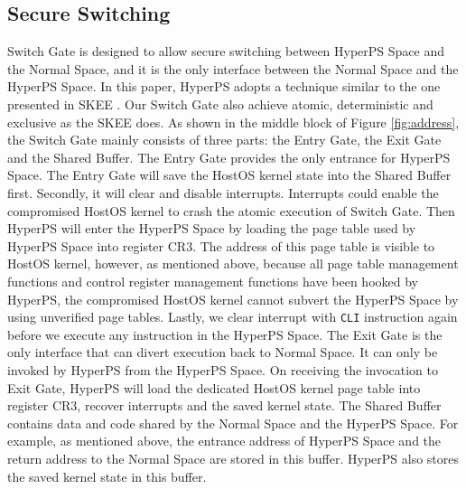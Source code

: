 \subsection{Secure Switching}%
\label{sub:secure_switching}


Switch Gate is designed to allow secure switching between HyperPS Space and the Normal Space, and it is the only interface between the Normal Space and the HyperPS Space. In this paper, HyperPS adopts a technique similar to the one presented in SKEE \cite{azab2016skee}. Our Switch Gate also achieve atomic, deterministic and exclusive as the SKEE does.
As shown in the middle block of Figure \ref{fig:address}, the Switch Gate mainly consists of three parts: the Entry Gate, the Exit Gate and the Shared Buffer. 
The Entry Gate provides the only entrance for HyperPS Space. The Entry Gate will save the HostOS kernel state into the Shared Buffer first. Secondly, it will clear and disable interrupts. Interrupts could enable the compromised HostOS kernel to crash the atomic execution of Switch Gate. 
Then HyperPS will enter the HyperPS Space by loading the page table used by HyperPS Space into register CR3. 
The address of this page table is visible to HostOS kernel, however, as mentioned above, because all page table management functions and control register management functions have been hooked by HyperPS, the compromised HostOS kernel cannot subvert the HyperPS Space by using unverified page tables. 
Lastly, we clear interrupt with \verb|CLI| instruction again before we execute any instruction in the HyperPS Space. 
The Exit Gate is the only interface that can divert execution back to Normal Space. It can only be invoked by HyperPS from the HyperPS Space. 
On receiving the invocation to Exit Gate, 
HyperPS will load the dedicated HostOS kernel page table into register CR3, recover interrupts and the saved kernel state. 
The Shared Buffer contains data and code shared by the Normal Space and the HyperPS Space. For example, as mentioned above, the entrance address of HyperPS Space and the return address to the Normal Space are stored in this buffer. HyperPS also stores the saved kernel state in this buffer. 

